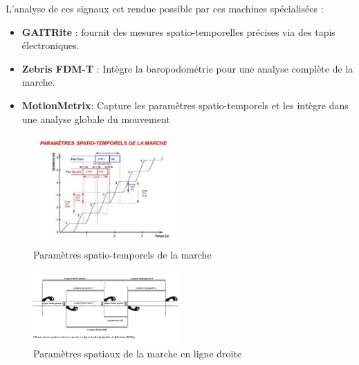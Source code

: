 L'analyse de ces signaux est rendue possible par ces machines spécialisées :
\begin{itemize}
  \item \textbf{GAITRite} : fournit des mesures spatio-temporelles précises via des tapis électroniques.
  \item \textbf{Zebris FDM-T} : Intègre la baropodométrie pour une analyse complète de la marche.
  \item \textbf{MotionMetrix}: Capture les paramètres spatio-temporels et les intègre dans une analyse globale du mouvement
\end{itemize}


\begin{figure}[ht]
  \centering
  \includegraphics[width=0.5\textwidth]{images/activites_posturo_cinetiques.png}
  \caption{Paramètres spatio-temporels de la marche}\label{fig:parametres_spatio_temporels}
  \label{fig:spatio_temporels_marche}
\end{figure}

\begin{figure}[ht]
  \centering
  \includegraphics[width=0.5\textwidth]{images/spatio-temporels-ligne-droite.png}
  \caption{Paramètres spatiaux de la marche en ligne droite}
  \label{fig:param_spatiaux_ligne_droite}
\end{figure}
